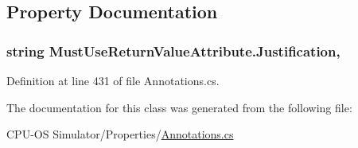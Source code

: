 \subsection{Property Documentation}
\hypertarget{class_must_use_return_value_attribute_a1cc4e1cefc25bbf346a0c292b09d541b}{}
\subsubsection[{Justification}]{\setlength{\rightskip}{0pt plus 5cm}string Must\+Use\+Return\+Value\+Attribute.\+Justification\hspace{0.3cm}{\ttfamily [get]}, {}}\label{class_must_use_return_value_attribute_a1cc4e1cefc25bbf346a0c292b09d541b}


Definition at line 431 of file Annotations.\+cs.



The documentation for this class was generated from the following file\+:\begin{DoxyCompactItemize}
\item 
C\+P\+U-\/\+O\+S Simulator/\+Properties/\hyperlink{_annotations_8cs}{Annotations.\+cs}\end{DoxyCompactItemize}
